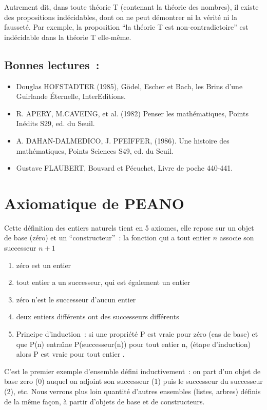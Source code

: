 Autrement dit, dans toute théorie T (contenant la théorie des
nombres), il existe des propositions indécidables, dont on ne peut
démontrer ni la vérité ni la fausseté. Par exemple, la proposition
``la théorie T est non-contradictoire'' est indécidable dans la
théorie T elle-m\^eme.


\subsection*{Bonnes lectures~:}

\begin{itemize}
\item Douglas HOFSTADTER (1985), G\"{o}del, Escher et Bach, les Brins d'une Guirlande Éternelle,  InterEditions.
\item R. APERY, M.CAVEING, et al. (1982) Penser les mathématiques, Points Inédits S29, ed. du Seuil.
\item A. DAHAN-DALMEDICO, J. PFEIFFER, (1986). Une histoire des mathématiques, Points Sciences S49, ed. du Seuil.
\item Gustave FLAUBERT, Bouvard et Pécuchet, Livre de poche 440-441.
\end{itemize}



\section{Axiomatique de PEANO}

Cette définition des entiers naturels tient en 5 axiomes, elle repose
sur un objet de base (zéro) et un ``constructeur''~: la fonction qui a
tout entier $n$ associe son successeur $n+1$
\begin{enumerate}
\item zéro est un entier
\item tout entier a un successeur, qui est également un entier
\item zéro n'est le successeur d'aucun entier
\item	 deux entiers différents ont des successeurs différents
\item Principe d'induction~: si une propriété P est vraie pour
 zéro (cas de base)
		 et que P(n) entra\^{\i}ne
 P(successeur(n)) pour tout entier n,  (étape d'induction)
		alors P est vraie pour tout entier .
\end{enumerate}

C'est le premier exemple d'ensemble défini inductivement~: on part
d'un objet de base zero (0) auquel on adjoint son successeur (1) puis
le successeur du successeur (2), etc. Nous verrons plus loin quantité
d'autres ensembles (listes, arbres) définis de la m\^eme fa\c{c}on, à
partir d'objets de base et de constructeurs.

